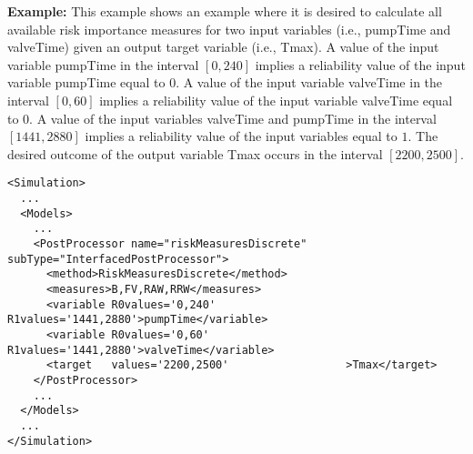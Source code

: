 \textbf{Example:}
This example shows an example where it is desired to calculate all available risk importance measures for two input variables (i.e., pumpTime and valveTime)
given an output target variable (i.e., Tmax).
A value of the input variable pumpTime in the interval $[0,240]$ implies a reliability value of the input variable pumpTime equal to $0$.
A value of the input variable valveTime in the interval $[0,60]$ implies a reliability value of the input variable valveTime equal to $0$.
A value of the input variables valveTime and pumpTime in the interval $[1441,2880]$ implies a reliability value of the input variables equal to $1$.
The desired outcome of the output variable Tmax occurs in the interval $[2200,2500]$.
\begin{lstlisting}[style=XML,morekeywords={subType,debug,name,class,type}]
<Simulation>
  ...
  <Models>
    ...
    <PostProcessor name="riskMeasuresDiscrete" subType="InterfacedPostProcessor">
      <method>RiskMeasuresDiscrete</method>
      <measures>B,FV,RAW,RRW</measures>
      <variable R0values='0,240' R1values='1441,2880'>pumpTime</variable>
      <variable R0values='0,60'  R1values='1441,2880'>valveTime</variable>
      <target   values='2200,2500'                  >Tmax</target>
    </PostProcessor>
    ...
  </Models>
  ...
</Simulation>
\end{lstlisting}

